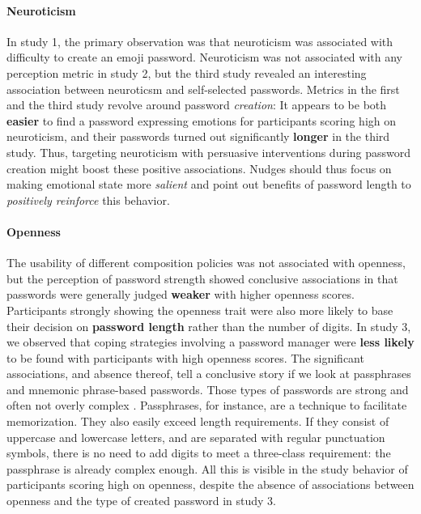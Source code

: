 \paragraph{Neuroticism} In study 1, the primary observation was that neuroticism was associated with difficulty to create an emoji password. Neuroticism was not associated with any perception metric in study 2, but the third study revealed an interesting association between neuroticsm and self-selected passwords. Metrics in the first and the third study revolve around password \textit{creation}: It appears to be both \textbf{easier} to find a password expressing emotions for participants scoring high on neuroticism, and their passwords turned out significantly \textbf{longer} in the third study. 
Thus, targeting neuroticism with persuasive interventions during password creation might boost these positive associations. Nudges should thus focus on making emotional state more \textit{salient} and point out benefits of password length to \textit{positively reinforce} this behavior. 

\paragraph{Openness} The usability of different composition policies was not associated with openness, but the perception of password strength showed conclusive associations in that passwords were generally judged \textbf{weaker} with higher openness scores. Participants strongly showing the openness trait were also more likely to base their decision on \textbf{password length} rather than the number of digits. In study 3, we observed that coping strategies involving a password manager were \textbf{less likely} to be found with participants with high openness scores. 
The significant associations, and absence thereof, tell a conclusive story if we look at passphrases and mnemonic phrase-based passwords. Those types of passwords are strong and often not overly complex \cite{Keith2009PassphraseDesign,Kuo2006HumanSelectionMnemonic,Shay2012CorrectHorseBatteryStaple}. Passphrases, for instance, are a technique to facilitate memorization. They also easily exceed length requirements. If they consist of uppercase and lowercase letters, and are separated with regular punctuation symbols, there is no need to add digits to meet a three-class requirement: the passphrase is already complex enough. All this is visible in the study behavior of participants scoring high on openness, despite the absence of associations between openness and the type of created password in study 3. 

